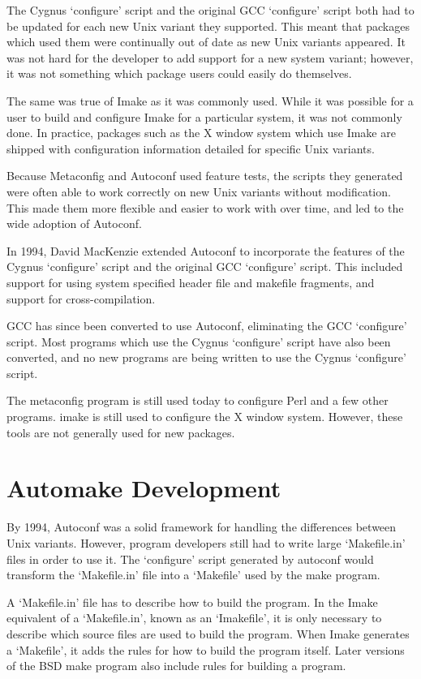 The Cygnus `configure' script and the original GCC `configure' script both had to be updated for each new Unix variant they supported. This meant that packages which used them were continually out of date as new Unix variants appeared. It was not hard for the developer to add support for a new system variant; however, it was not something which package users could easily do themselves. 


The same was true of Imake as it was commonly used. While it was possible for a user to build and configure Imake for a particular system, it was not commonly done. In practice, packages such as the X window system which use Imake are shipped with configuration information detailed for specific Unix variants. 


Because Metaconfig and Autoconf used feature tests, the scripts they generated were often able to work correctly on new Unix variants without modification. This made them more flexible and easier to work with over time, and led to the wide adoption of Autoconf. 


In 1994, David MacKenzie extended Autoconf to incorporate the features of the Cygnus `configure' script and the original GCC `configure' script. This included support for using system specified header file and makefile fragments, and support for cross-compilation. 


GCC has since been converted to use Autoconf, eliminating the GCC `configure' script. Most programs which use the Cygnus `configure' script have also been converted, and no new programs are being written to use the Cygnus `configure' script. 


The metaconfig program is still used today to configure Perl and a few other programs. imake is still used to configure the X window system. However, these tools are not generally used for new packages.

\section{Automake Development}


By 1994, Autoconf was a solid framework for handling the differences between Unix variants. However, program developers still had to write large `Makefile.in' files in order to use it. The `configure' script generated by autoconf would transform the `Makefile.in' file into a `Makefile' used by the make program. 


A `Makefile.in' file has to describe how to build the program. In the Imake equivalent of a `Makefile.in', known as an `Imakefile', it is only necessary to describe which source files are used to build the program. When Imake generates a `Makefile', it adds the rules for how to build the program itself. Later versions of the BSD make program also include rules for building a program. 


